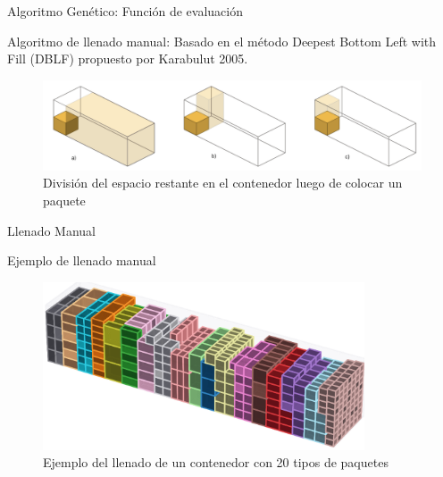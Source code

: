 \documentclass[handout]{beamer}
\begin{document}
\begin{frame}{Algoritmo Genético: Función de evaluación}
    \begin{exampleblock}{Algoritmo de llenado manual:}
        Basado en el método Deepest Bottom Left with Fill (DBLF) propuesto por Karabulut 2005.
        \begin{figure}
            \centering
            \includegraphics[width=1\textwidth]{pic/dblf.png}
            \caption*{División del espacio restante en el contenedor luego de colocar un paquete}
            \label{fig:dblf}
        \end{figure}
    \end{exampleblock}
\end{frame}


\begin{frame}{Llenado Manual}
    \begin{exampleblock}{Ejemplo de llenado manual}
        \begin{figure}
            \centering
            \includegraphics[width=0.85\textwidth]{pic/contenedor-lleno.png}
            \caption*{Ejemplo del llenado de un contenedor con 20 tipos de paquetes}
            \label{fig:contenedor-lleno}
        \end{figure}
    \end{exampleblock}
\end{frame}
\end{document}
